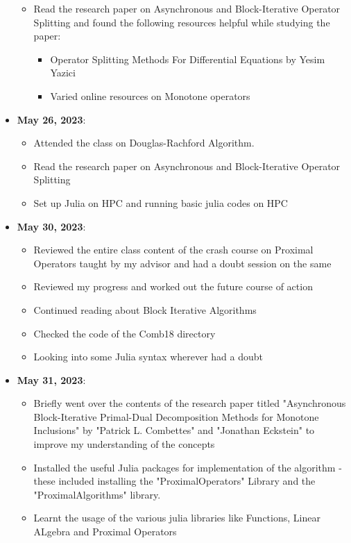 \documentclass[a4paper,11pt,fleqn]{article}
\theoremstyle{plain}{\theorembodyfont{\rmfamily}%
\newtheorem{conjecture}[theorem]{Conjecture}}
\theoremstyle{plain}{\theorembodyfont{\rmfamily}%
\newtheorem{example}[theorem]{Example}}
\theoremstyle{plain}{\theorembodyfont{\rmfamily}%
\newtheorem{remark}[theorem]{Remark}}
\theoremstyle{plain}{\theorembodyfont{\rmfamily}%
\newtheorem{algorithm}[theorem]{Algorithm}}
\theoremstyle{plain}{\theorembodyfont{\rmfamily}%
\newtheorem{condition}[theorem]{Condition}}
\theoremstyle{plain}{\theorembodyfont{\rmfamily}%
\newtheorem{definition}[theorem]{Definition}}
\theoremstyle{plain}{\theorembodyfont{\rmfamily}
\newtheorem{fact}[theorem]{Fact}}
\theoremstyle{plain}{\theorembodyfont{\rmfamily}
\newtheorem{problem}[theorem]{Problem}}
\theoremstyle{plain}{\theorembodyfont{\rmfamily}
\newtheorem{notation}[theorem]{Notation}}
\theoremstyle{plain}{\theorembodyfont{\rmfamily}
\newtheorem{project}[theorem]{Project}}
\begin{document}
\begin{itemize}
\begin{itemize}
    \item Read the research paper on Asynchronous and Block-Iterative Operator Splitting and found the following resources helpful while studying the paper:
    \begin{itemize}
        \item Operator Splitting Methods For Differential Equations by Yesim Yazici
        \item Varied online resources on Monotone operators
    \end{itemize}
\end{itemize}
\item 
{\bf May 26, 2023}:
\begin{itemize}
    \item Attended the class on Douglas-Rachford Algorithm.
    \item Read the research paper on Asynchronous and Block-Iterative Operator Splitting 
    \item Set up Julia on HPC and running basic julia codes on HPC
\end{itemize}

\item 
{\bf May 30, 2023}:
\begin{itemize} 
    \item Reviewed the entire class content of the crash course on Proximal Operators taught by my advisor and had a doubt session on the same
    \item Reviewed my progress and worked out the future course of action
    \item Continued reading about Block Iterative Algorithms
    \item Checked the code of the Comb18 directory 
    \item Looking into some Julia syntax wherever had a doubt
\end{itemize}


\item 
{\bf May 31, 2023}:
\begin{itemize} 
    \item Briefly went over the contents of the research paper titled "Asynchronous Block-Iterative Primal-Dual Decomposition Methods for Monotone Inclusions" by "Patrick L. Combettes" and "Jonathan Eckstein" to improve my understanding of the concepts
    \item Installed the useful Julia packages for implementation of the algorithm - these included installing the "ProximalOperators" Library and the "ProximalAlgorithms" library.
    \item Learnt the usage of the various julia libraries like Functions, Linear ALgebra and Proximal Operators
\end{itemize}


\end{itemize}
\end{document}
